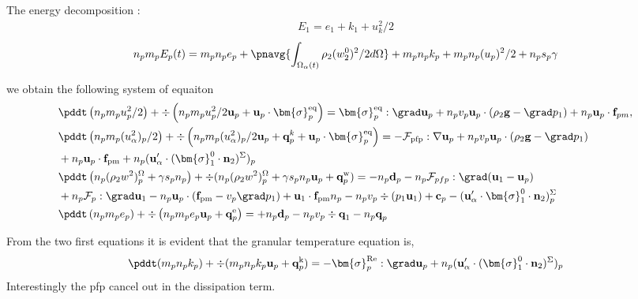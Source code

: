 The energy decomposition :
\begin{align*}
    E_1 = e_1 + k_1 + u_k^2/2
\end{align*}
\begin{equation*}
    n_p m_p E_p(t) 
    = m_p n_p e_p 
    + \pnavg{\int_{\Omega_\alpha(t)} \rho_2  (w_2^0)^2/2 d\Omega}
    + m_p n_p k_p
    + m_p n_p (u_p)^2/2
    + n_p s_p \gamma
\end{equation*}


we obtain the following system of equaiton 
\begin{align*}
    &\pddt \left(n_p m_p u_p^2/ 2\right)
    + \div \left(n_p
    m_p u_p^2/ 2 \textbf{u}_p 
    + \textbf{u}_p \cdot \bm{\sigma}_p^\text{eq}
    \right)
    = 
     \bm{\sigma}_p^\text{eq}  :\grad \textbf{u}_p
    +  n_p v_p \textbf{u}_p \cdot 
    (\rho_2 \textbf{g} - \grad p_1)
    + n_p \textbf{u}_p \cdot \textbf{f}_{pm},\\
    &\pddt \left(n_p m_p (u_\alpha^2)_p/ 2\right)
    + \div \left(n_p
    m_p (u_\alpha^2)_p/ 2 \textbf{u}_p 
    + \textbf{q}^k_p
    + \textbf{u}_p \cdot \bm{\sigma}_p^\text{eq}
    \right)
    = 
    - \mathcal{F}_\text{pfp} : \nabla \textbf{u}_p
    + n_p v_p \textbf{u}_p \cdot
    (\rho_2 \textbf{g} - \grad p_1)\\
    &+ n_p\textbf{u}_p \cdot \textbf{f}_\text{pm}
    +n_p(\textbf{u}_\alpha'\cdot(\bm{\sigma}_1^0 \cdot \textbf{n}_2)^\Sigma)_p
    \\
    &\pddt \left(n_p (\rho_2 w^2 )_p^\Omega+\gamma s_p n_p\right)
    + \div 
    (n_p (\rho_2 w^2 )_p^\Omega+\gamma s_p n_p
    \textbf{u}_p 
    +  \textbf{q}_p^\text{w}
    )
    = 
    - n_p \textbf{d}_p
    - n_p \mathcal{F}_{pfp} : \grad (\textbf{u}_1 - \textbf{u}_p)\\
    &+ n_p \mathcal{F}_p : \grad \textbf{u}_1
    - n_p \textbf{u}_p \cdot (\textbf{f}_\text{pm} - v_p\grad p_1)
    + \textbf{u}_1  \cdot \textbf{f}_\text{pm}n_p 
    - n_pv_p \div (p_1 \textbf{u}_1)
    + \textbf{c}_p
    - (\textbf{u}_\alpha' \cdot \bm{\sigma}_1^0 \cdot  \textbf{n}_2)^\Sigma_p\\
    &\pddt \left(n_p m_p e_p\right)
    + \div \left(n_p
    m_p e_p \textbf{u}_p 
    +  \textbf{q}_p^\text{e}
    \right)
    = 
    + n_p \textbf{d}_p
    - n_p v_p \div \textbf{q}_1
    - n_p \textbf{q}_p\\
\end{align*}


From the two first equations it is evident that the granular temperature equation is, 
\begin{multline*}
    \pddt(m_p n_pk_p)
    + \div(m_pn_p k_p \textbf{u}_p 
    + \textbf{q}_p^\text{k})
    = 
     - \bm{\sigma}_p^\text{Re} :\grad \textbf{u}_p
     + n_p (\textbf{u}_\alpha' \cdot (\bm{\sigma}_1^0 \cdot  \textbf{n}_2)^\Sigma)_p
    \\
\end{multline*}
Interestingly the pfp cancel out in the dissipation term. 

